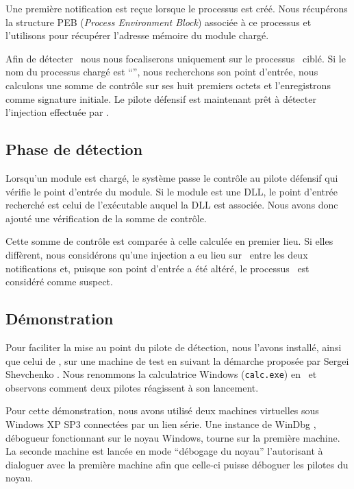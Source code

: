 Une première notification est reçue lorsque le processus est créé.
Nous récupérons la structure PEB (\emph{Process Environment Block}) associée à ce processus et l'utilisons pour récupérer l'adresse mémoire du module chargé.

Afin de détecter \duqu\ nous nous focaliserons uniquement sur le processus \services\ ciblé.
Si le nom du processus chargé est ``\services '', nous recherchons son point d'entrée, nous calculons une somme de contrôle sur ses huit premiers octets et l'enregistrons comme signature initiale.
Le pilote défensif est maintenant prêt à détecter l'injection effectuée par \duqu.

\subsection{Phase de détection}
Lorsqu'un module est chargé, le système passe le contrôle au pilote défensif qui vérifie le point d'entrée du module.
Si le module est une DLL, le point d'entrée recherché est celui de l'exécutable auquel la DLL est associée.
Nous avons donc ajouté une vérification de la somme de contrôle.

Cette somme de contrôle est comparée à celle calculée en premier lieu.
Si elles diffèrent, nous considérons qu'une injection a eu lieu sur \services\ entre les deux notifications et, puisque son point d'entrée a été altéré, le processus \services\ est considéré comme suspect.


\subsection{Démonstration}
Pour faciliter la mise au point du pilote de détection, nous l'avons installé, ainsi que celui de \duqu, sur une machine de test en suivant la démarche proposée par Sergei Shevchenko \cite{SShevchenko}.
Nous renommons la calculatrice Windows (\texttt{calc.exe}) en \services\ et observons comment deux pilotes réagissent à son lancement.

Pour cette démonstration, nous avons utilisé deux machines virtuelles sous Windows XP SP3 connectées par un lien série.
Une instance de WinDbg \cite{WinDbg}, débogueur fonctionnant sur le noyau Windows, tourne sur la première machine.
La seconde machine est lancée en mode ``débogage du noyau'' l'autorisant à dialoguer avec la première machine afin que celle-ci puisse déboguer les pilotes du noyau.

